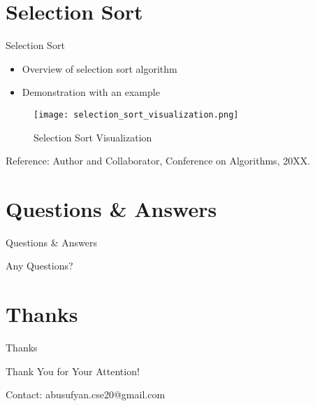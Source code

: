 \documentclass{beamer}
\begin{document}
\section{Selection Sort}
\begin{frame}{Selection Sort}
  \begin{itemize}
    \item Overview of selection sort algorithm
    \item Demonstration with an example
  \end{itemize}

  \vfill
  \begin{figure}
    \centering
    \texttt{[image: selection\_sort\_visualization.png]}
    \caption{Selection Sort Visualization}
    \label{fig:selection-sort}
  \end{figure}

  \vfill
  \begin{flushright}
    \tiny{Reference: Author and Collaborator, Conference on Algorithms, 20XX.}
  \end{flushright}
\end{frame}

\section{Questions \& Answers}
\begin{frame}{Questions \& Answers}
  \begin{center}
    \Huge Any Questions?
  \end{center}
\end{frame}

\section{Thanks}
\begin{frame}{Thanks}
  \begin{center}
    \Huge Thank You for Your Attention!
  \end{center}

  \vspace{1cm}
  \begin{flushright}
    \normalsize{Contact: abusufyan.cse20@gmail.com}
  \end{flushright}
\end{frame}
\end{document}
